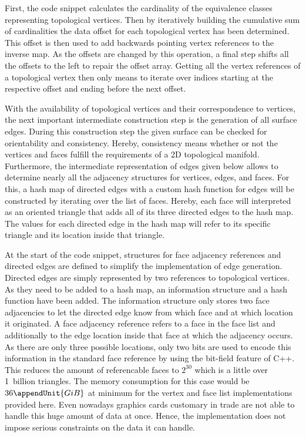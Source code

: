 \documentclass{stdlocal}
\begin{document}
  First, the code snippet calculates the cardinality of the equivalence classes representing topological vertices.
  Then by iteratively building the cumulative sum of cardinalities the data offset for each topological vertex has been determined.
  This offset is then used to add backwards pointing vertex references to the inverse map.
  As the offsets are changed by this operation, a final step shifts all the offsets to the left to repair the offset array.
  Getting all the vertex references of a topological vertex then only means to iterate over indices starting at the respective offset and ending before the next offset.

  With the availability of topological vertices and their correspondence to vertices, the next important intermediate construction step is the generation of all surface edges.
  During this construction step the given surface can be checked for orientability and consistency.
  Hereby, consistency means whether or not the vertices and faces fulfill the requirements of a 2D topological manifold.
  Furthermore, the intermediate representation of edges given below allows to determine nearly all the adjacency structures for vertices, edges, and faces.
  For this, a hash map of directed edges with a custom hash function for edges will be constructed by iterating over the list of faces.
  Hereby, each face will interpreted as an oriented triangle that adds all of its three directed edges to the hash map.
  The values for each directed edge in the hash map will refer to its specific triangle and its location inside that triangle.

  At the start of the code snippet, structures for face adjacency references and directed edges are defined to simplify the implementation of edge generation.
  Directed edges are simply represented by two references to topological vertices.
  As they need to be added to a hash map, an information structure and a hash function have been added.
  The information structure only stores two face adjacencies to let the directed edge know from which face and at which location it originated.
  A face adjacency reference refers to a face in the face list and additionally to the edge location inside that face at which the adjacency occurs.
  As there are only three possible locations, only two bits are used to encode this information in the standard face reference by using the bit-field feature of C++.
  This reduces the amount of referencable faces to $2^{30}$ which is a little over 1~billion triangles.
  The memory consumption for this case would be $36\appendUnit{GiB}$ at minimum for the vertex and face list implementations provided here.
  Even nowadays graphics cards customary in trade are not able to handle this huge amount of data at once.
  Hence, the implementation does not impose serious constraints on the data it can handle.
\end{document}
